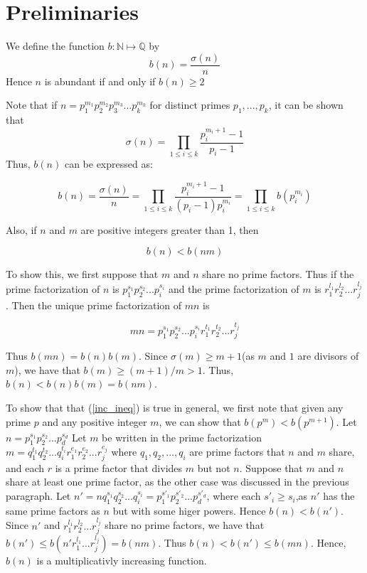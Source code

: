 \documentclass[../paper.tex]{article}
\begin{document}
\section{Preliminaries}

We define the function $b: \mathbb{N} \mapsto \mathbb{Q}$ by
%
$$b(n) = \frac{\sigma(n)}{n} $$
%
Hence $n$ is abundant if and only if $b(n) \geq 2$

Note that if $n=p_1^{m_1}p_2^{m_2}p_3^{m_3}...p_{k}^{m_k}$ 
for distinct primes $p_1, ..., p_k$, it can be shown that 
%
$$\sigma(n) = \prod_{1 \leq i \leq k} \frac{p_i^{m_i + 1} -1}{p_i -1}$$
%
Thus, $b(n)$ can be expressed as:


\begin{equation}\label{b_stuff}
  b(n) = \frac{\sigma(n)}{n} = \prod_{1 \leq i \leq k} 
  \frac{p_i^{m_i + 1} -1}{(p_i -1)p_{i}^{m_{i}}}
  =\prod_{1 \leq i \leq k} b(p_i^{m_i})
\end{equation}

Also, if $n$ and $m$ are positive integers greater than 1, then

\begin{equation}\label{inc_ineq}
  b(n) < b(nm) %
\end{equation}

To show this, we first suppose that $m$ and $n$ share no prime factors.
Thus if the prime factorization of $n$ is $p_1^{s_1} p_2^{s_2} ... p_i^{s_i}$ 
and the prime factorization of $m$ is $r_1^{l_1} r_2^{l_2} ... r_j^{l_j}$.
Then the unique prime factorization of $mn$ is 

$$mn = p_1^{s_1} p_2^{s_2} ... p_i^{s_i} r_1^{t_1} r_2^{t_2} ... r_j^{t_j}$$

Thus $b(mn) = b(n)b(m)$. Since $\sigma(m) \geq m + 1$(as $m$ and 
$1$ are divisors of $m$), we have that $b(m) \geq (m + 1) / m > 1$.
Thus,
$b(n) < b(n)b(m) = b(nm)$. 


To show that that (\ref{inc_ineq}) is true in general,
we first note that given any prime $p$ and
any positive integer $m$, we can show that $b(p^m) < b(p^{m + 1})$.
Let $n = p_1^{s_1} p_2^{s_2}... p_d^{s_d}$ 
Let $m$ be written in the prime factorization 
$m = q_1^{t_1} q_2^{t_2} ... q_i^{t_i} 
r_1^{e_1} r_2^{e_2} ... r_j^{e_j}$ where 
$q_1, q_2, ..., q_i$ are prime factors that $n$ and $m$ share,
and each $r$ is a prime factor that divides $m$ but not $n$.
Suppose that $m$ and $n$ share at least one prime factor, as the 
other case was discussed in the previous paragraph.
%
Let $n' = n q_1^{s_1} q_2^{s_2} ... q_i^{s_i} =
p_1^{s'_1} p_2^{s'_2} ... p_d^{s'_d}$, where each $s'_i \geq s_i$,as
$n'$ has the same prime factors as $n$ but with some higer powers.
Hence $b(n) < b(n')$. Since $n'$ and $r_1^{l_1} r_2^{l_2} ... r_j^{l_j}$
share no prime factors, we have that 
$b(n') \leq b(n' r_1^{l_1} ... r_j^{l_j}) = b(nm)$.
Thus $b(n) < b(n') \leq b(mn)$. Hence, $b(n)$ is a 
multiplicativly increasing function.
\\
\end{document}
